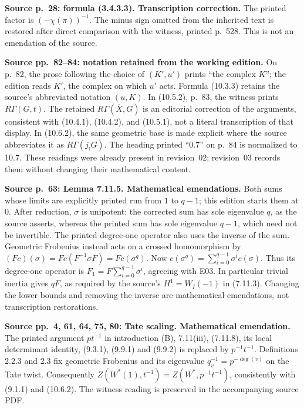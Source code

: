 \documentclass[10pt,letterpaper]{article}
\begin{document}
\begin{description}[style=nextline,leftmargin=2.6em,labelwidth=2.2em,font=\normalfont\bfseries]
\item[E16] \textbf{Source p.~28: formula (3.4.3.3). Transcription correction.} The printed factor is \((-\chi(\pi))^{-1}\). The minus sign omitted from the inherited text is restored after direct comparison with the witness, printed p.~528. This is not an emendation of the source.
\item[E17] \textbf{Source pp.~82--84: notation retained from the working edition.} On p.~82, the prose following the choice of \((K',u')\) prints ``the complex \(K\)''; the edition reads \(K'\), the complex on which \(u'\) acts. Formula (10.3.3) retains the source's abbreviated notation \((u,K)\). In (10.5.2), p.~83, the witness prints \(R\Gamma(G,t)\). The retained \(R\Gamma(\overline X,G)\) is an editorial correction of the arguments, consistent with (10.4.1), (10.4.2), and (10.5.1), not a literal transcription of that display. In (10.6.2), the same geometric base is made explicit where the source abbreviates it as \(R\Gamma(j_!G)\). The heading printed ``0.7'' on p.~84 is normalized to 10.7. These readings were already present in revision~02; revision~03 records them without changing their mathematical content.
\item[E18] \textbf{Source p.~63: Lemma 7.11.5. Mathematical emendations.} Both sums whose limits are explicitly printed run from \(1\) to \(q-1\); this edition starts them at \(0\). After reduction, \(\sigma\) is unipotent: the corrected sum has sole eigenvalue \(q\), as the source asserts, whereas the printed sum has sole eigenvalue \(q-1\), which need not be invertible. The printed degree-one operator also uses the inverse of the sum. Geometric Frobenius instead acts on a crossed homomorphism by \((Fc)(\sigma)=F c(F^{-1}\sigma F)=F c(\sigma^q)\). Now \(c(\sigma^q)=\sum_{i=0}^{q-1}\sigma^i c(\sigma)\). Thus its degree-one operator is \(F_1=F\sum_{i=0}^{q-1}\sigma^i\), agreeing with E03. In particular trivial inertia gives \(qF\), as required by the source's \(H^1=W_I(-1)\) in (7.11.3). Changing the lower bounds and removing the inverse are mathematical emendations, not transcription restorations.

\item[E19] \textbf{Source pp.~4, 61, 64, 75, 80: Tate scaling. Mathematical emendation.} The printed argument \(pt^{-1}\) in introduction (B), 7.11(iii), (7.11.8), its local determinant identity, (9.3.1), (9.9.1) and (9.9.2) is replaced by \(p^{-1}t^{-1}\). Definitions 2.2.3 and 2.3 fix geometric Frobenius and its eigenvalue \(q_v^{-1}=p^{-\deg(v)}\) on the Tate twist. Consequently \(Z(W^*(1),t^{-1})=Z(W^*,p^{-1}t^{-1})\), consistently with (9.1.1) and (10.6.2). The witness reading is preserved in the accompanying source PDF.


\end{description}
\end{document}
